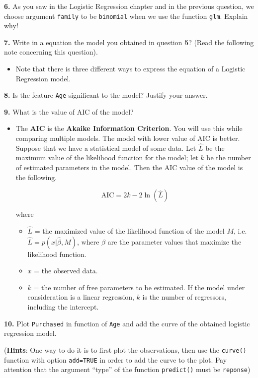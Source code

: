 \documentclass[]{book}
\providecommand{\tightlist}{%
  \setlength{\itemsep}{0pt}\setlength{\parskip}{0pt}}
\newenvironment{rmdblock}[1]
  {\begin{shaded*}
  \begin{itemize}
  \renewcommand{\labelitemi}{
    \raisebox{-.7\height}[0pt][0pt]{
      {\setkeys{Gin}{width=2em,keepaspectratio}\texttt{[image: img/icons/\#1]}}
    }
  }
  \item
  }
  {
  \end{itemize}
  \end{shaded*}
  }
\newenvironment{rmdinsight}
  {\begin{rmdblock}{insight}}
  {\end{rmdblock}}
\newenvironment{rmdtip}
  {\begin{rmdblock}{tip}}
  {\end{rmdblock}}
\theoremstyle{definition}
\theoremstyle{definition}
\theoremstyle{definition}
\theoremstyle{remark}
\begin{document}
\textbf{6.} As you saw in the Logistic Regression chapter and in the
previous question, we choose argument \texttt{family} to be
\texttt{binomial} when we use the function \texttt{glm}. Explain why!

\textbf{7.} Write in a equation the model you obtained in question
\textbf{5}? (Read the following note concerning this question).

\begin{rmdtip}
Note that there is three different ways to express the equation of a
Logistic Regression model.
\end{rmdtip}

\textbf{8.} Is the feature \texttt{Age} significant to the model?
Justify your answer.

\textbf{9.} What is the value of AIC of the model?

\begin{rmdinsight}
The \textbf{AIC} is the \textbf{Akaike Information Criterion}. You will
use this while comparing multiple models. The model with lower value of
AIC is better. Suppose that we have a statistical model of some data.
Let \({\hat {L}}\) be the maximum value of the likelihood function for
the model; let \(k\) be the number of estimated parameters in the model.
Then the AIC value of the model is the following.

\[ \text{AIC} = 2 k-2 \ln(\hat{L})\]

where

\begin{itemize}
\tightlist
\item
  \(\hat{L}\) = the maximized value of the likelihood function of the
  model \(M\), i.e. \(\hat{L}=p(x|{\hat{\beta }},M)\), where
  \(\hat{\beta}\) are the parameter values that maximize the likelihood
  function.
\item
  \(x\) = the observed data.
\item
  \(k\) = the number of free parameters to be estimated. If the model
  under consideration is a linear regression, \(k\) is the number of
  regressors, including the intercept.
\end{itemize}
\end{rmdinsight}

\textbf{10.} Plot \texttt{Purchased} in function of \texttt{Age} and add
the curve of the obtained logistic regression model.

(\textbf{Hints}: One way to do it is to first plot the observations,
then use the \texttt{curve()} function with option \texttt{add=TRUE} in
order to add the curve to the plot. Pay attention that the argument
``type'' of the function \texttt{predict()} must be \texttt{reponse})
\end{document}
